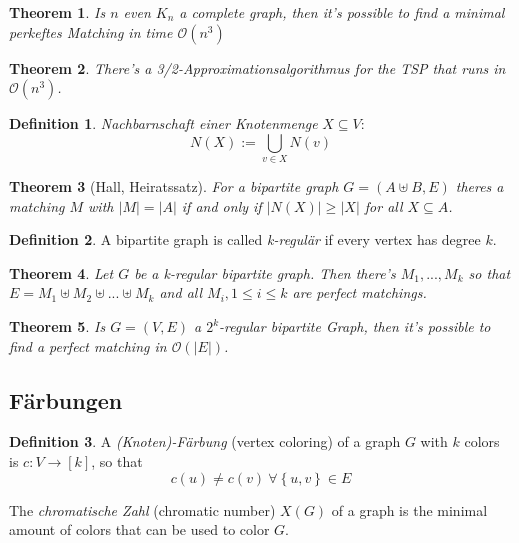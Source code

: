 \documentclass[12pt]{extarticle}
\theoremstyle{definition}
\newtheorem{definition}{Definition}
\theoremstyle{remark}
\theoremstyle{plain}
\newtheorem{theorem}{Theorem}
\theoremstyle{plain}
\theoremstyle{plain}
\newcommand{\BO}{\mathcal{O}}
\begin{document}
\begin{theorem}
    Is $n$ even $K_n$ a complete graph, then it's possible to find a \textit{minimal perkeftes Matching} in time $\BO(n^3)$
\end{theorem}

\begin{theorem}
    There's a 3/2-Approximationsalgorithmus for the TSP that runs in $\BO(n^3)$.
\end{theorem}

\begin{definition}
    \textit{Nachbarnschaft einer Knotenmenge} $X \subseteq V$:
    \[ N(X) := \bigcup_{v \in X} N(v) \]
\end{definition}

\begin{theorem}[Hall, Heiratssatz]
    For a bipartite graph $G = (A \uplus B, E)$ theres a matching $M$ with $|M| = |A|$ if and only if $|N(X)| \ge |X|$ for all $X \subseteq A$.
\end{theorem}

\begin{definition}
    A bipartite graph is called \textit{k-regulär} if every vertex has degree $k$.
\end{definition}

\begin{theorem}
    Let $G$ be a k-regular bipartite graph. Then there's $M_1, ..., M_k$ so that $E = M_1 \uplus M_2 \uplus ... \uplus M_k$ and all
    $M_i, 1 \le i \le k$ are perfect matchings.
\end{theorem}

\begin{theorem}
    Is $G = (V, E)$ a $2^k$-regular bipartite Graph, then it's possible to find a perfect matching in $\BO(|E|)$.
\end{theorem}

\subsection{Färbungen}

\begin{definition}
    A \textit{(Knoten)-Färbung} (vertex coloring) of a graph $G$ with $k$ colors is $c: V \to [k]$, so that
    \[ c(u) \ne c(v)\ \forall \left\{ u, v \right\} \in E \]

    The \textit{chromatische Zahl} (chromatic number) $X(G)$ of a graph is the minimal amount of colors that can be used to
    color $G$.
\end{definition}
\end{document}
